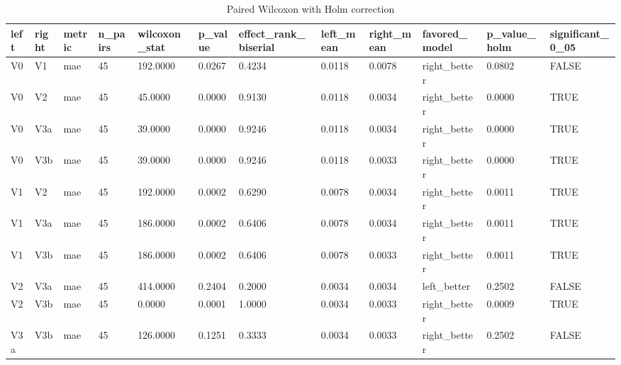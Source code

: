 \begin{table}[htbp]
\centering
\begin{tabular}{llllllllllll}
\hline
left & right & metric & n_pairs & wilcoxon_stat & p_value & effect_rank_biserial & left_mean & right_mean & favored_model & p_value_holm & significant_0_05 \\
\hline
V0 & V1 & mae & 45 & 192.0000 & 0.0267 & 0.4234 & 0.0118 & 0.0078 & right_better & 0.0802 & FALSE \\
V0 & V2 & mae & 45 & 45.0000 & 0.0000 & 0.9130 & 0.0118 & 0.0034 & right_better & 0.0000 & TRUE \\
V0 & V3a & mae & 45 & 39.0000 & 0.0000 & 0.9246 & 0.0118 & 0.0034 & right_better & 0.0000 & TRUE \\
V0 & V3b & mae & 45 & 39.0000 & 0.0000 & 0.9246 & 0.0118 & 0.0033 & right_better & 0.0000 & TRUE \\
V1 & V2 & mae & 45 & 192.0000 & 0.0002 & 0.6290 & 0.0078 & 0.0034 & right_better & 0.0011 & TRUE \\
V1 & V3a & mae & 45 & 186.0000 & 0.0002 & 0.6406 & 0.0078 & 0.0034 & right_better & 0.0011 & TRUE \\
V1 & V3b & mae & 45 & 186.0000 & 0.0002 & 0.6406 & 0.0078 & 0.0033 & right_better & 0.0011 & TRUE \\
V2 & V3a & mae & 45 & 414.0000 & 0.2404 & 0.2000 & 0.0034 & 0.0034 & left_better & 0.2502 & FALSE \\
V2 & V3b & mae & 45 & 0.0000 & 0.0001 & 1.0000 & 0.0034 & 0.0033 & right_better & 0.0009 & TRUE \\
V3a & V3b & mae & 45 & 126.0000 & 0.1251 & 0.3333 & 0.0034 & 0.0033 & right_better & 0.2502 & FALSE \\
\hline
\end{tabular}
\caption{Paired Wilcoxon with Holm correction}
\label{table_statistical_tests}
\end{table}